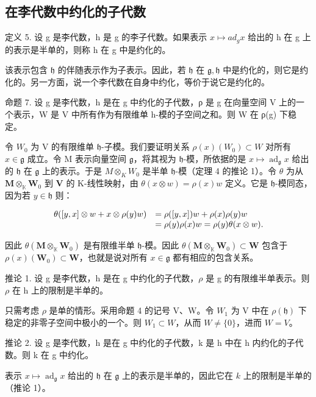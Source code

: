 \subsection{在李代数中约化的子代数}

定义 5. 设 g 是李代数，h 是 g 的李子代数。如果表示 \(x \mapsto ad_{g} x\) 给出的 h 在 g 上的表示是半单的，则称 h 在 g 中是约化的。

该表示包含 \(\mathfrak{h}\) 的伴随表示作为子表示。因此，若 \(\mathfrak{h}\) 在 \(\mathfrak{g},\mathfrak{h}\) 中是约化的，则它是约化的。另一方面，说一个李代数在自身中约化，等价于说它是约化的。

命题 7. 设 g 是李代数，h 是在 g 中约化的子代数，ρ 是 g 在向量空间 V 上的一个表示，W 是 V 中所有作为有限维单 h-模的子空间之和。则 W 在 ρ(g) 下稳定。

令 \(W_0\) 为 V 的有限维单 \(\mathfrak{h}\)-子模。我们要证明关系 \(\rho(x)(W_0) \subset W\) 对所有 \(x \in \mathfrak{g}\) 成立。令 M 表示向量空间 \(\mathfrak{g}\)，将其视为 \(\mathfrak{h}\)-模，所依据的是 \(x \mapsto \operatorname{ad}_{\mathfrak{g}} x\) 给出的 \(\mathfrak{h}\) 在 \(\mathfrak{g}\) 上的表示。于是 \(M \otimes_{K} W_0\) 是半单 \(\mathfrak{h}\)-模（定理 4 的推论 1）。令 \(\theta\) 为从 \(\mathbf{M} \otimes_{\mathbb{K}} \mathbf{W}_0\) 到 \(\mathbf{V}\) 的 K-线性映射，由 \(\theta(x \otimes w) = \rho(x)w\) 定义。它是 \(\mathfrak{h}\)-模同态，因为若 \(y \in \mathfrak{h}\) 则：

\[
\begin{array}{r l} \theta ([ y, x ] \otimes w + x \otimes \rho (y) w) & = \rho ([ y, x ]) w + \rho (x) \rho (y) w \\ & = \rho (y) \rho (x) w = \rho (y) \theta (x \otimes w). \end{array}
\]

因此 \(\theta (\mathbf{M}\otimes_{\mathbb{K}}\mathbf{W}_0)\) 是有限维半单 \(\mathfrak{h}\)-模。因此 \(\theta (\mathbf{M}\otimes_{\mathbb{K}}\mathbf{W}_0)\subset \mathbf{W}\) 包含于 \(\rho (x)(\mathbf{W}_0)\subset \mathbf{W}\)，也就是说对所有 \(x\in \mathfrak{g}\) 都有相应的包含关系。

推论 1. 设 g 是李代数，h 是在 g 中约化的子代数，\(\rho\) 是 g 的有限维半单表示。则 \(\rho\) 在 h 上的限制是半单的。

只需考虑 \(\rho\) 是单的情形。采用命题 4 的记号 V、W。令 \(W_{1}\) 为 V 中在 \(\rho(\mathfrak{h})\) 下稳定的非零子空间中极小的一个。则 \(W_{1} \subset W\)，从而 \(W \neq \{0\}\)，进而 \(W = V\)。

推论 2. 设 g 是李代数，h 是在 g 中约化的子代数，k 是 h 中在 h 内约化的子代数。则 k 在 g 中约化。

表示 \(x \mapsto \operatorname{ad}_{\mathfrak{g}} x\) 给出的 \(\mathfrak{h}\) 在 \(\mathfrak{g}\) 上的表示是半单的，因此它在 \(k\) 上的限制是半单的（推论 1）。

